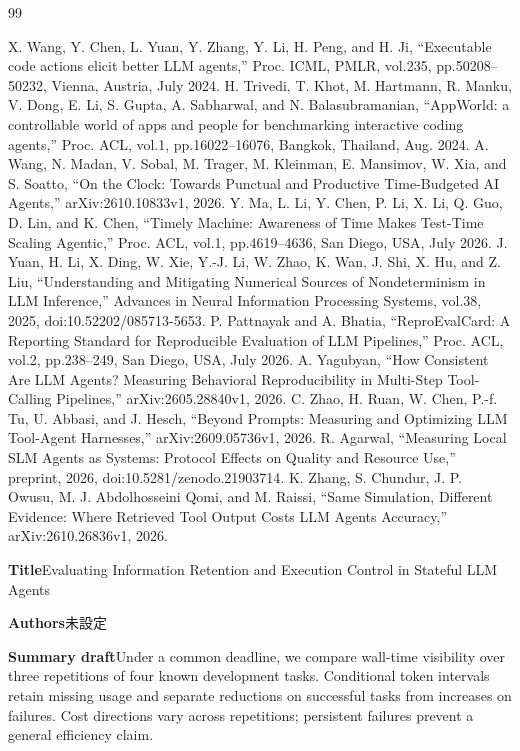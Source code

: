 \documentclass[uplatex,a4paper,twocolumn,10pt]{jsarticle}
\begin{document}
\begin{thebibliography}{99}
\raggedright
{} X. Wang, Y. Chen, L. Yuan, Y. Zhang, Y. Li, H. Peng, and H. Ji, ``Executable code actions elicit better LLM agents,'' Proc. ICML, PMLR, vol.235, pp.50208--50232, Vienna, Austria, July 2024.
 H. Trivedi, T. Khot, M. Hartmann, R. Manku, V. Dong, E. Li, S. Gupta, A. Sabharwal, and N. Balasubramanian, ``AppWorld: a controllable world of apps and people for benchmarking interactive coding agents,'' Proc. ACL, vol.1, pp.16022--16076, Bangkok, Thailand, Aug. 2024.
 A. Wang, N. Madan, V. Sobal, M. Trager, M. Kleinman, E. Mansimov, W. Xia, and S. Soatto, ``On the Clock: Towards Punctual and Productive Time-Budgeted AI Agents,'' arXiv:2610.10833v1, 2026.
 Y. Ma, L. Li, Y. Chen, P. Li, X. Li, Q. Guo, D. Lin, and K. Chen, ``Timely Machine: Awareness of Time Makes Test-Time Scaling Agentic,'' Proc. ACL, vol.1, pp.4619--4636, San Diego, USA, July 2026.
 J. Yuan, H. Li, X. Ding, W. Xie, Y.-J. Li, W. Zhao, K. Wan, J. Shi, X. Hu, and Z. Liu, ``Understanding and Mitigating Numerical Sources of Nondeterminism in LLM Inference,'' Advances in Neural Information Processing Systems, vol.38, 2025, doi:10.52202/085713-5653.
 P. Pattnayak and A. Bhatia, ``ReproEvalCard: A Reporting Standard for Reproducible Evaluation of LLM Pipelines,'' Proc. ACL, vol.2, pp.238--249, San Diego, USA, July 2026.
 A. Yagubyan, ``How Consistent Are LLM Agents? Measuring Behavioral Reproducibility in Multi-Step Tool-Calling Pipelines,'' arXiv:2605.28840v1, 2026.
 C. Zhao, H. Ruan, W. Chen, P.-f. Tu, U. Abbasi, and J. Hesch, ``Beyond Prompts: Measuring and Optimizing LLM Tool-Agent Harnesses,'' arXiv:2609.05736v1, 2026.
 R. Agarwal, ``Measuring Local SLM Agents as Systems: Protocol Effects on Quality and Resource Use,'' preprint, 2026, doi:10.5281/zenodo.21903714.
 K. Zhang, S. Chundur, J. P. Owusu, M. J. Abdolhosseini Qomi, and M. Raissi, ``Same Simulation, Different Evidence: Where Retrieved Tool Output Costs LLM Agents Accuracy,'' arXiv:2610.26836v1, 2026.
\end{thebibliography}
\clearpage
\onecolumn
\noindent\textbf{Title}\quad Evaluating Information Retention and Execution Control in Stateful LLM Agents

\noindent\textbf{Authors}\quad 未設定

\noindent\textbf{Summary draft}\quad Under a common deadline, we compare wall-time visibility over three repetitions of four known development tasks. Conditional token intervals retain missing usage and separate reductions on successful tasks from increases on failures. Cost directions vary across repetitions; persistent failures prevent a general efficiency claim.
\end{document}
